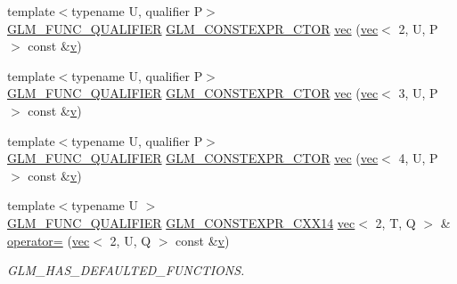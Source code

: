 \begin{DoxyCompactItemize}
\item 
{\footnotesize template$<$typename U, qualifier P$>$ }\\\mbox{\hyperlink{setup_8hpp_a33fdea6f91c5f834105f7415e2a64407}{G\+L\+M\+\_\+\+F\+U\+N\+C\+\_\+\+Q\+U\+A\+L\+I\+F\+I\+ER}} \mbox{\hyperlink{setup_8hpp_ad34178a09666081abdb573c14d1f4a5a}{G\+L\+M\+\_\+\+C\+O\+N\+S\+T\+E\+X\+P\+R\+\_\+\+C\+T\+OR}} \mbox{\hyperlink{structglm_1_1vec_3_012_00_01_t_00_01_q_01_4_aa42a169b552cd4f61ee71641723d2d9b}{vec}} (\mbox{\hyperlink{structglm_1_1vec}{vec}}$<$ 2, U, P $>$ const \&\mbox{\hyperlink{_s_d_l__opengl_8h_a10a82eabcb59d2fcd74acee063775f90}{v}})
\item 
{\footnotesize template$<$typename U, qualifier P$>$ }\\\mbox{\hyperlink{setup_8hpp_a33fdea6f91c5f834105f7415e2a64407}{G\+L\+M\+\_\+\+F\+U\+N\+C\+\_\+\+Q\+U\+A\+L\+I\+F\+I\+ER}} \mbox{\hyperlink{setup_8hpp_ad34178a09666081abdb573c14d1f4a5a}{G\+L\+M\+\_\+\+C\+O\+N\+S\+T\+E\+X\+P\+R\+\_\+\+C\+T\+OR}} \mbox{\hyperlink{structglm_1_1vec_3_012_00_01_t_00_01_q_01_4_ac6f3c81265603dd5c06c75776911aff4}{vec}} (\mbox{\hyperlink{structglm_1_1vec}{vec}}$<$ 3, U, P $>$ const \&\mbox{\hyperlink{_s_d_l__opengl_8h_a10a82eabcb59d2fcd74acee063775f90}{v}})
\item 
{\footnotesize template$<$typename U, qualifier P$>$ }\\\mbox{\hyperlink{setup_8hpp_a33fdea6f91c5f834105f7415e2a64407}{G\+L\+M\+\_\+\+F\+U\+N\+C\+\_\+\+Q\+U\+A\+L\+I\+F\+I\+ER}} \mbox{\hyperlink{setup_8hpp_ad34178a09666081abdb573c14d1f4a5a}{G\+L\+M\+\_\+\+C\+O\+N\+S\+T\+E\+X\+P\+R\+\_\+\+C\+T\+OR}} \mbox{\hyperlink{structglm_1_1vec_3_012_00_01_t_00_01_q_01_4_a369d48c9ccf09e6ef21f17178abf9f81}{vec}} (\mbox{\hyperlink{structglm_1_1vec}{vec}}$<$ 4, U, P $>$ const \&\mbox{\hyperlink{_s_d_l__opengl_8h_a10a82eabcb59d2fcd74acee063775f90}{v}})
\item 
{\footnotesize template$<$typename U $>$ }\\\mbox{\hyperlink{setup_8hpp_a33fdea6f91c5f834105f7415e2a64407}{G\+L\+M\+\_\+\+F\+U\+N\+C\+\_\+\+Q\+U\+A\+L\+I\+F\+I\+ER}} \mbox{\hyperlink{setup_8hpp_a4dd12abf5e1164bc57f3a34671d03844}{G\+L\+M\+\_\+\+C\+O\+N\+S\+T\+E\+X\+P\+R\+\_\+\+C\+X\+X14}} \mbox{\hyperlink{structglm_1_1vec}{vec}}$<$ 2, T, Q $>$ \& \mbox{\hyperlink{structglm_1_1vec_3_012_00_01_t_00_01_q_01_4_a9bd00e17d1fda738c0e07b652e39e7f6}{operator=}} (\mbox{\hyperlink{structglm_1_1vec}{vec}}$<$ 2, U, Q $>$ const \&\mbox{\hyperlink{_s_d_l__opengl_8h_a10a82eabcb59d2fcd74acee063775f90}{v}})
\begin{DoxyCompactList}\small\item\em G\+L\+M\+\_\+\+H\+A\+S\+\_\+\+D\+E\+F\+A\+U\+L\+T\+E\+D\+\_\+\+F\+U\+N\+C\+T\+I\+O\+NS. \end{DoxyCompactList}\item 

\end{DoxyCompactItemize}
